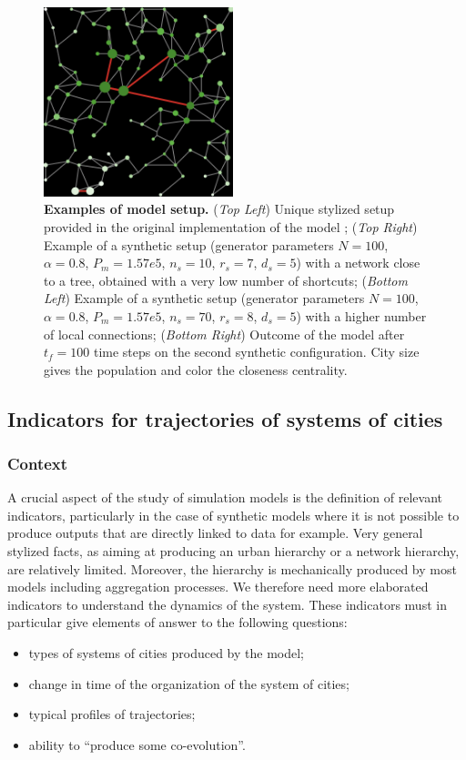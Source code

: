 \begin{figure}
	\includegraphics[width=0.49\textwidth]{figures/setup_synth_1_tick100.png}
	\caption{\textbf{Examples of model setup.} (\textit{Top Left}) Unique stylized setup provided in the original implementation of the model \cite{schmitt2014modelisation}; (\textit{Top Right}) Example of a synthetic setup (generator parameters $N=100$, $\alpha=0.8$, $P_m =1.57e5$, $n_s = 10$, $r_s=7$, $d_s = 5$) with a network close to a tree, obtained with a very low number of shortcuts; (\textit{Bottom Left}) Example of a synthetic setup (generator parameters $N=100$, $\alpha=0.8$, $P_m =1.57e5$, $n_s = 70$, $r_s=8$, $d_s = 5$) with a higher number of local connections; (\textit{Bottom Right}) Outcome of the model after $t_f = 100$ time steps on the second synthetic configuration. City size gives the population and color the closeness centrality.\label{fig:exsetup}}
\end{figure}



\subsection{Indicators for trajectories of systems of cities}

\subsubsection{Context}

A crucial aspect of the study of simulation models is the definition of relevant indicators, particularly in the case of synthetic models where it is not possible to produce outputs that are directly linked to data for example. Very general stylized facts, as aiming at producing an urban hierarchy or a network hierarchy, are relatively limited. Moreover, the hierarchy is mechanically produced by most models including aggregation processes. We therefore need more elaborated indicators to understand the dynamics of the system. These indicators must in particular give elements of answer to the following questions:
\begin{itemize}
	\item types of systems of cities produced by the model;
	\item change in time of the organization of the system of cities;
	\item typical profiles of trajectories;
	\item ability to ``produce some co-evolution''.
\end{itemize}


